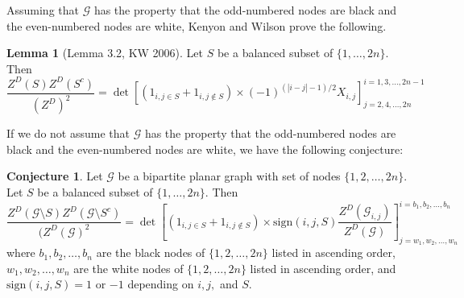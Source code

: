 \documentclass[11pt]{amsart}
\theoremstyle{definition}
\newtheorem*{conj*}{Conjecture}
\newtheorem*{lemma*}{Lemma}
\begin{document}
Assuming that $\mathcal{G}$ has the property that the odd-numbered nodes are black and the even-numbered nodes are white, Kenyon and Wilson prove the following. 

\begin{lemma*}[Lemma 3.2, KW 2006]
Let $S$ be a balanced subset of $\{1, \ldots, 2n\}$. Then
$$\dfrac{Z^{D}(S) Z^{D}(S^{c})}{(Z^{D})^{2}} = 
\det[(1_{i, j \in S} + 1_{i, j \notin S}) \times (-1)^{(|i - j| -1)/2} X_{i, j} ]^{i = 1, 3, \ldots, 2n-1}_{j = 2, 4, \ldots, 2n}$$
\end{lemma*}

If we do not assume that $\mathcal{G}$ has the property that the odd-numbered nodes are black and the even-numbered nodes are white, we have the following conjecture:

\begin{conj*}
Let $\mathcal{G}$ be a bipartite planar graph with set of nodes $\{1, 2, \ldots, 2n\}$. Let $S$ be a balanced subset of $\{1, \ldots, 2n\}$. Then 
$$\dfrac{Z^{D}(\mathcal{G} \setminus S) Z^{D}(\mathcal{G} \setminus S^{c})}{(Z^{D}(\mathcal{G})^{2}} = 
\det \left[(1_{i, j \in S} + 1_{i, j \notin S}) \times \text{sign}(i, j, S) \dfrac{Z^{D}(\mathcal{G}_{i, j})}{Z^{D}(\mathcal{G})} \right]^{i = b_1, b_2, \ldots, b_n}_{j = w_1, w_2, \ldots, w_n}$$
where $b_1, b_2, \ldots, b_n$ are the black nodes of $\{1, 2, \ldots, 2n\}$ listed in ascending order,$w_1, w_2, \ldots, w_n$ are the white nodes of $\{1, 2, \ldots, 2n\}$ listed in ascending order, and $\text{sign}(i, j, S) = 1$ or $-1$ depending on $i, j,$ and $S$. 
\end{conj*}
\end{document}
